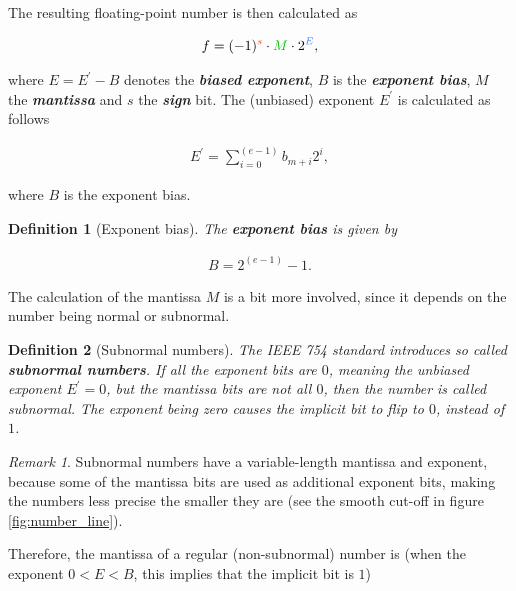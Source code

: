 \documentclass{article}
\theoremstyle{plain} %
\newtheorem{definition}{Definition}[section]
\theoremstyle{convention} %
\theoremstyle{remark} %
\newtheorem*{remark}{Remark} %
\def\df#1{\textbf{\textit{#1}}}
\numberwithin{equation}{section}
\begin{document}
The resulting floating-point number is then calculated as

\begin{align*}
    f = (-1)^{\textcolor{corange}{s}} \cdot \textcolor{cgreen}{M} \cdot 2^{\textcolor{cblue}{E}},
\end{align*}

where $E=E^{\prime}-B$ denotes the \df{biased exponent}, $B$ is the \df{exponent bias}, $M$ the \df{mantissa} and $s$ the \df{sign} bit. The (unbiased) exponent $E^{\prime}$ is calculated as follows

\begin{align}
    E^{\prime} = \sum_{i=0}^{(e-1)} b_{m+i} 2^i, \label{eq:exponent}
\end{align}

where $B$ is the exponent bias.

\begin{definition}[Exponent bias]

The \df{exponent bias} is given by

\begin{align*}
    B = 2^{(e-1)} -1.
\end{align*}

\end{definition}

The calculation of the mantissa $M$ is a bit more involved, since it depends on the number being normal or subnormal.

\begin{definition}[Subnormal numbers]

The IEEE 754 standard introduces so called \df{subnormal numbers}. If all the exponent bits are $0$, meaning the unbiased exponent $E^{\prime}=0$, but the mantissa bits are not all $0$, then the number is called subnormal. The exponent being zero causes the implicit bit to flip to $0$, instead of $1$.

\end{definition}

\begin{remark}
    Subnormal numbers have a variable-length mantissa and exponent, because some of the mantissa bits are used as additional exponent bits, making the numbers less precise the smaller they are (see the smooth cut-off in figure \ref{fig:number_line}).
\end{remark}

Therefore, the mantissa of a regular (non-subnormal) number is (when the exponent $0<E<B$, this implies that the implicit bit is $1$)
\end{document}
